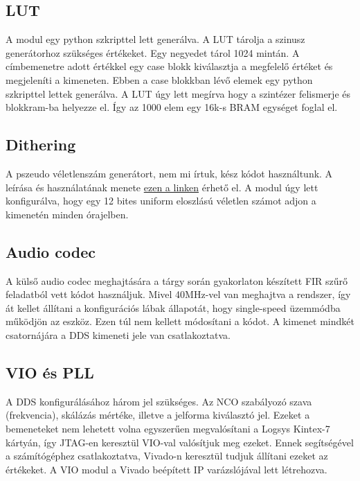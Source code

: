 \documentclass[a4paper,11pt]{article}
\begin{document}
\subsection{LUT}

A modul egy python szkripttel lett generálva.
A LUT tárolja a szinusz generátorhoz szükséges értékeket. Egy negyedet tárol 1024 mintán. A címbemenetre adott értékkel egy case blokk kiválasztja a megfelelő értéket és megjeleníti a kimeneten. Ebben a case blokkban lévő elemek egy python szkripttel lettek generálva. A LUT úgy lett megírva hogy a szintézer felismerje és blokkram-ba helyezze el. Így az 1000 elem egy 16k-s BRAM egységet foglal el.

\subsection{Dithering}

A pszeudo véletlenszám generátort, nem mi írtuk, kész kódot használtunk. A leírása és használatának menete \href{https://eewiki.net/pages/viewpage.action?pageId=16351401}{ezen a linken} érhető el. A modul úgy lett konfigurálva, hogy egy 12 bites uniform eloszlású véletlen számot adjon a kimenetén minden órajelben.

\subsection{Audio codec}

A külső audio codec meghajtására a tárgy során gyakorlaton készített FIR szűrő feladatból vett kódot használjuk. Mivel 40MHz-vel van meghajtva a rendszer, így át kellet állítani a konfigurációs lábak állapotát, hogy single-speed üzemmódba működjön az eszköz. Ezen túl nem kellett módosítani a kódot. A kimenet mindkét csatornájára a DDS kimeneti jele van csatlakoztatva.

\subsection{VIO és PLL}
A DDS konfigurálásához három jel szükséges. Az NCO szabályozó szava (frekvencia), skálázás mértéke, illetve a jelforma kiválasztó jel. Ezeket a bemeneteket nem lehetett volna egyszerűen megvalósítani a Logsys Kintex-7 kártyán, így JTAG-en keresztül VIO-val valósítjuk meg ezeket. Ennek segítségével a számítógéphez csatlakoztatva, Vivado-n keresztül tudjuk állítani ezeket az értékeket. A VIO modul a Vivado beépített IP varázslójával lett létrehozva.
\end{document}
